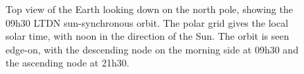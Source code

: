 \begin{figure}[H]
\caption{Top view of the Earth looking down on the north pole, showing the 09h30 LTDN sun-synchronous orbit. The polar grid gives the local solar time, with noon in the direction of the Sun. The orbit is seen edge-on, with the descending node on the morning side at 09h30 and the ascending node at 21h30.}
\label{fig:ltdn_orbit}
\end{figure}

